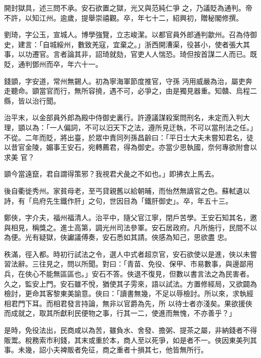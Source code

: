 \begin{pinyinscope}
 開封獄具，述三問不承。安石欲置之獄，光又與范純仁爭
 之，乃議貶為通判。帝不許，以知江州。逾歲，提舉崇禧觀。卒，年七十二，紹興初，贈秘閣修撰。



 劉琦，字公玉，宣城人。博學強覽，立志峻潔。以都官員外郎通判歙州。召為侍御史，建言：「自城綏州，數致羌寇，宜棄之。」浙西開漕渠，役甚小，使者張大其事，以功遷官。言者論其非，詔琦就劾，官吏人人惴恐。琦但按首謀二人而已。既貶，通判鄧州而卒，年六十一。



 錢顗，字安道，常州無錫人。初為寧海軍節度推官，守孫
 沔用威嚴為治，屬吏奔走聽命。顗當官而行，無所容撓，遇不可，必爭之，由是獨見器重。知贛、烏程二縣，皆以治行聞。



 治平末，以金部員外郎為殿中侍御史裏行。許遵議謀殺案問刑名，未定而入判大理，顗以為：「一人偏詞，不可以汨天下之法，遵所見迂執，不可以當刑法之任。」不從。二年而貶，將出臺，於眾中責同列孫昌齡曰：「平日士大夫未嘗知君名，徒以昔官金陵，媚事王安石，宛轉薦君，得為御史。亦當少思執國，奈何專欲附會以求美
 官？



 顗今當遠竄，君自謂得策邪？我視君犬彘之不如也。」即拂衣上馬去。



 後自衢徙秀州。家貧母老，至丐貸親舊以給朝晡，而怡然無謫官之色。蘇軾遺以詩，有「烏府先生鐵作肝」之句，世因目為「鐵肝御史」。卒，年五十三。



 鄭俠，字介夫，福州福清人。治平中，隨父官江寧，閉戶苦學。王安石知其名，邀與相見，稱獎之。進士高第，調光州司法參軍。安石居政府。凡所施行，民間不以為便。光有疑獄，俠讞議傅奏，安石悉如其請。俠感為知己，思欲盡
 忠。



 秩滿，徑入都。時初行試法之令，選人中式者超京官，安石欲使以是進，俠以未嘗習法辭。三往見之，問以所聞。對曰：「青苗、免役、保甲、市易數事，與邊鄙用兵，在俠心不能無區區也。」安石不答。俠退不復見，但數以書言法之為民害者。久之，監安上門。安石雖不悅，猶使其子雱來，語以試法。方置修經局，又欲闢為檢討，更命其客黎東美諭意。俠曰：「讀書無幾，不足以辱檢討。所以來，求執經相君門下耳。而相君發言持論，無非以官爵為先，所
 以待士者亦淺矣。果欲援俠而成就之，取其所獻利民便物之事，行其一二，使進而無愧，不亦善乎？」



 是時，免役法出，民商咸以為苦，雖負水、舍發、擔粥、提茶之屬，非納錢者不得販鬻。稅務索市利錢，其末或重於本，商人至以死爭，如是者不一。俠因東美列其事。未幾，詔小夫裨販者免征，商之重者十損其七，他皆無所行。




\end{pinyinscope}
